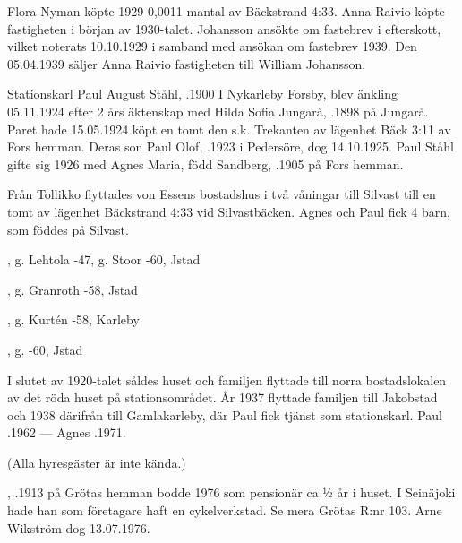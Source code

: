 %
Flora Nyman köpte 1929 0,0011 mantal av Bäckstrand 4:33. Anna Raivio  köpte fastigheten i början av 1930-talet. Johansson ansökte om fastebrev i efterskott, vilket noterats 10.10.1929 i samband med ansökan	om fastebrev 1939. Den 05.04.1939 säljer Anna Raivio fastigheten till William Johansson.


%
Stationskarl Paul August Ståhl, .1900 I Nykarleby Forsby, blev änkling 05.11.1924 efter 2 års äktenskap med Hilda Sofia Jungarå, .1898 på Jungarå. Paret hade 15.05.1924	köpt en tomt den s.k. Trekanten av lägenhet Bäck 3:11 av Fors hemman. Deras son Paul Olof, .1923 i Pedersöre, dog 14.10.1925.	Paul Ståhl gifte sig 1926 med Agnes Maria, född Sandberg, .1905 på Fors hemman.

Från Tollikko flyttades von Essens bostadshus i två våningar till	Silvast till en tomt av lägenhet Bäckstrand 4:33 vid Silvastbäcken. Agnes och Paul fick 4 barn, som föddes på Silvast.
\begin{jhchildren}
  \item {}, g. Lehtola -47, g. Stoor -60, Jstad
  \item {}, g. Granroth -58, Jstad
  \item {}, g. Kurtén -58, Karleby
  \item {}, g. -60, Jstad
\end{jhchildren}
I slutet av 1920-talet såldes huset och familjen flyttade till norra bostadslokalen av det röda huset på stationsområdet. År 1937 flyttade 	familjen till Jakobstad och 1938 därifrån till Gamlakarleby, där Paul fick tjänst som stationskarl.  Paul .1962  ---  Agnes .1971.


  (Alla hyresgäster är inte kända.)

, .1913 på Grötas hemman bodde 1976 som pensionär ca ½ år i huset. I Seinäjoki hade han som företagare haft en cykelverkstad. Se mera Grötas R:nr 103. Arne Wikström dog 13.07.1976.

